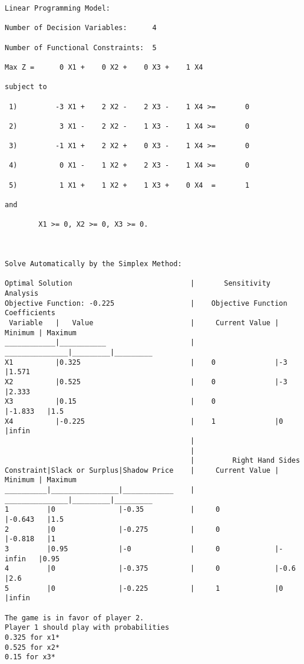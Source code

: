 \documentclass[titlepage, letterpaper]{article}
\begin{document}
\begin{lstlisting}[basicstyle=\tiny]



Linear Programming Model:

Number of Decision Variables:      4

Number of Functional Constraints:  5

Max Z =      0 X1 +    0 X2 +    0 X3 +    1 X4 

subject to

 1)         -3 X1 +    2 X2 -    2 X3 -    1 X4 >=       0

 2)          3 X1 -    2 X2 -    1 X3 -    1 X4 >=       0

 3)         -1 X1 +    2 X2 +    0 X3 -    1 X4 >=       0

 4)          0 X1 -    1 X2 +    2 X3 -    1 X4 >=       0

 5)          1 X1 +    1 X2 +    1 X3 +    0 X4  =       1

and

        X1 >= 0, X2 >= 0, X3 >= 0.



Solve Automatically by the Simplex Method:

Optimal Solution                            |       Sensitivity Analysis
Objective Function: -0.225                  |    Objective Function Coefficients
 Variable   |   Value                       |     Current Value | Minimum | Maximum 
____________|___________                    |    _______________|_________|_________
X1          |0.325                          |    0              |-3       |1.571
X2          |0.525                          |    0              |-3       |2.333
X3          |0.15                           |    0              |-1.833   |1.5
X4          |-0.225                         |    1              |0        |infin
                                            |
                                            |
                                            |         Right Hand Sides
Constraint|Slack or Surplus|Shadow Price    |     Current Value | Minimum | Maximum 
__________|________________|____________    |    _______________|_________|_________
1         |0               |-0.35           |     0             |-0.643   |1.5
2         |0               |-0.275          |     0             |-0.818   |1
3         |0.95            |-0              |     0             |-infin   |0.95
4         |0               |-0.375          |     0             |-0.6     |2.6
5         |0               |-0.225          |     1             |0        |infin

The game is in favor of player 2.
Player 1 should play with probabilities
0.325 for x1*
0.525 for x2*
0.15 for x3*
\end{lstlisting}
\end{document}
